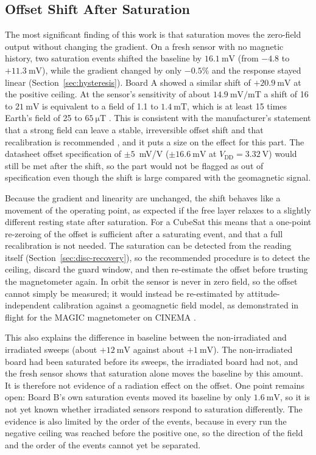 \documentclass[12pt,a4paper]{article}
\begin{document}
\subsection{Offset Shift After Saturation}
\label{sec:disc-hysteresis}

The most significant finding of this work is that saturation moves the zero-field output without changing the gradient. On a fresh sensor with no magnetic history, two saturation events shifted the baseline by $\SI{16.1}{\milli\volt}$ (from $-4.8$ to $+\SI{11.3}{\milli\volt}$), while the gradient changed by only $-0.5\%$ and the response stayed linear (Section~\ref{sec:hysteresis}). Board A showed a similar shift of $+\SI{20.9}{\milli\volt}$ at the positive ceiling. At the sensor's sensitivity of about $\SI{14.9}{\milli\volt\per\milli\tesla}$ a shift of 16 to $\SI{21}{\milli\volt}$ is equivalent to a field of 1.1 to $\SI{1.4}{\milli\tesla}$, which is at least 15 times Earth's field of 25 to $\SI{65}{\micro\tesla}$ \cite{wmm}. This is consistent with the manufacturer's statement that a strong field can leave a stable, irreversible offset shift and that recalibration is recommended \cite{allegro_an133}, and it puts a size on the effect for this part. The datasheet offset specification of $\pm 5$~mV/V ($\pm\SI{16.6}{\milli\volt}$ at $V_{\text{DD}} = \SI{3.32}{\volt}$) \cite{ct100_datasheet} would still be met after the shift, so the part would not be flagged as out of specification even though the shift is large compared with the geomagnetic signal.

Because the gradient and linearity are unchanged, the shift behaves like a movement of the operating point, as expected if the free layer relaxes to a slightly different resting state after saturation. For a CubeSat this means that a one-point re-zeroing of the offset is sufficient after a saturating event, and that a full recalibration is not needed. The saturation can be detected from the reading itself (Section~\ref{sec:disc-recovery}), so the recommended procedure is to detect the ceiling, discard the guard window, and then re-estimate the offset before trusting the magnetometer again. In orbit the sensor is never in zero field, so the offset cannot simply be measured; it would instead be re-estimated by attitude-independent calibration against a geomagnetic field model, as demonstrated in flight for the MAGIC magnetometer on CINEMA \cite{archer2015}.

This also explains the difference in baseline between the non-irradiated and irradiated sweeps (about $+\SI{12}{\milli\volt}$ against about $+\SI{1}{\milli\volt}$). The non-irradiated board had been saturated before its sweeps, the irradiated board had not, and the fresh sensor shows that saturation alone moves the baseline by this amount. It is therefore not evidence of a radiation effect on the offset. One point remains open: Board B's own saturation events moved its baseline by only $\SI{1.6}{\milli\volt}$, so it is not yet known whether irradiated sensors respond to saturation differently. The evidence is also limited by the order of the events, because in every run the negative ceiling was reached before the positive one, so the direction of the field and the order of the events cannot yet be separated.
\end{document}
